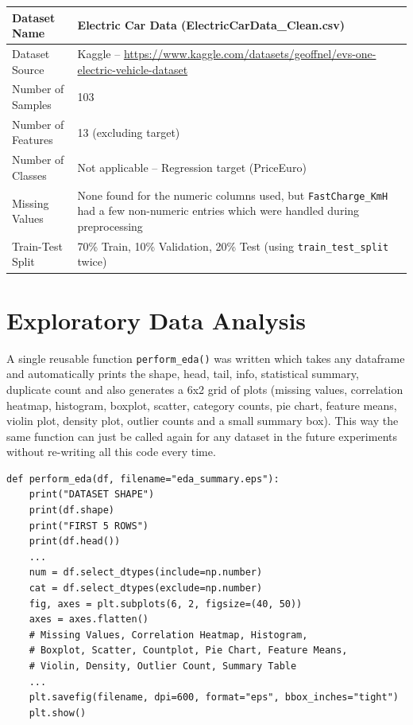 \documentclass[12pt,a4paper]{article}
\begin{document}
\begin{longtable}{|p{6cm}|p{8cm}|}
\hline
Dataset Name & Electric Car Data (ElectricCarData\_Clean.csv) \\ \hline
Dataset Source & Kaggle -- \url{https://www.kaggle.com/datasets/geoffnel/evs-one-electric-vehicle-dataset} \\ \hline
Number of Samples & 103 \\ \hline
Number of Features & 13 (excluding target) \\ \hline
Number of Classes & Not applicable -- Regression target (PriceEuro) \\ \hline
Missing Values & None found for the numeric columns used, but \texttt{FastCharge\_KmH} had a few non-numeric entries which were handled during preprocessing \\ \hline
Train-Test Split & 70\% Train, 10\% Validation, 20\% Test (using \texttt{train\_test\_split} twice) \\ \hline
\end{longtable}

\section{Exploratory Data Analysis}
A single reusable function \texttt{perform\_eda()} was written which takes any dataframe and automatically prints the shape, head, tail, info, statistical summary, duplicate count and also generates a 6x2 grid of plots (missing values, correlation heatmap, histogram, boxplot, scatter, category counts, pie chart, feature means, violin plot, density plot, outlier counts and a small summary box). This way the same function can just be called again for any dataset in the future experiments without re-writing all this code every time.

\begin{lstlisting}[caption={Reusable EDA function (trimmed for space, full version in notebook)}]
def perform_eda(df, filename="eda_summary.eps"):
    print("DATASET SHAPE")
    print(df.shape)
    print("FIRST 5 ROWS")
    print(df.head())
    ...
    num = df.select_dtypes(include=np.number)
    cat = df.select_dtypes(exclude=np.number)
    fig, axes = plt.subplots(6, 2, figsize=(40, 50))
    axes = axes.flatten()
    # Missing Values, Correlation Heatmap, Histogram,
    # Boxplot, Scatter, Countplot, Pie Chart, Feature Means,
    # Violin, Density, Outlier Count, Summary Table
    ...
    plt.savefig(filename, dpi=600, format="eps", bbox_inches="tight")
    plt.show()
\end{lstlisting}
\end{document}
